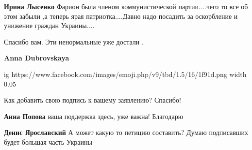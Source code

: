 \begin{itemize}
\begin{itemize}
\textbf{Ирина Лысенко} Фарион была членом коммунистической партии....чего то
все об этом забыли ,а теперь ярая патриотка....Давно надо посадить за
оскорбление и унижение граждан Украины....
\end{itemize}

 
Спасибо вам. Эти ненормальные уже достали .

\begin{itemize}
 
\textbf{Anna Dubrovskaya} 

\ifcmt
  ig https://www.facebook.com/images/emoji.php/v9/tbd/1.5/16/1f91d.png
  width 0.05
\fi

\end{itemize}

 
Как добавить свою подпись к вашему заявлению? Спасибо!

\begin{itemize}
 
\textbf{Анна Попова} ваша поддержка здесь, уже важна! Благодарю

 
\textbf{Денис Ярославский} А может какую то петицию составить? Думаю подписавших будет большая часть Украины


\end{itemize}
\end{itemize}
